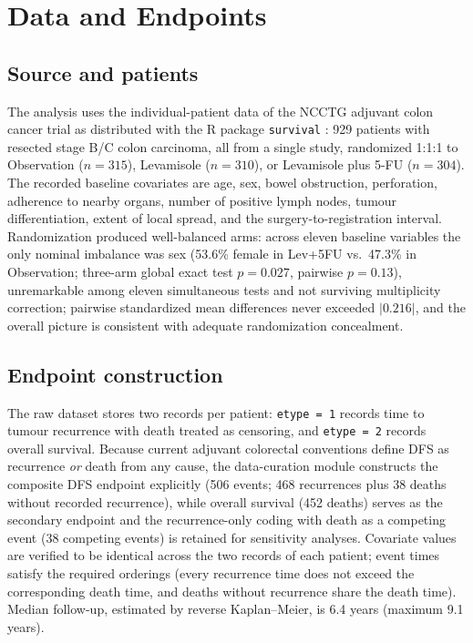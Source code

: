\section{Data and Endpoints}\label{sec:data}

\subsection{Source and patients}

The analysis uses the individual-patient data of the NCCTG adjuvant colon
cancer trial as distributed with the R package \texttt{survival}
\citep{therneau2026}: 929 patients with resected stage B/C colon
carcinoma, all from a single study, randomized 1:1:1 to Observation
($n=315$), Levamisole ($n=310$), or Levamisole plus 5-FU ($n=304$). The
recorded baseline covariates are age, sex, bowel obstruction,
perforation, adherence to nearby organs, number of positive lymph nodes,
tumour differentiation, extent of local spread, and the
surgery-to-registration interval. Randomization produced well-balanced
arms: across eleven baseline variables the only nominal imbalance was
sex (53.6\% female in Lev+5FU vs.\ 47.3\% in Observation; three-arm
global exact test $p=0.027$, pairwise $p=0.13$), unremarkable among
eleven simultaneous tests and not surviving multiplicity correction;
pairwise standardized mean differences never exceeded $|0.216|$, and the
overall picture is consistent with adequate randomization concealment.

\subsection{Endpoint construction}

The raw dataset stores two records per patient: \texttt{etype~=~1} records
time to tumour recurrence with death treated as censoring, and
\texttt{etype~=~2} records overall survival. Because current adjuvant
colorectal conventions define DFS as recurrence \emph{or} death from any
cause, the data-curation module constructs the composite DFS endpoint
explicitly (506 events; 468 recurrences plus 38 deaths without recorded
recurrence), while overall survival (452 deaths) serves as the secondary
endpoint and the recurrence-only coding with death as a competing event
(38 competing events) is retained for sensitivity analyses. Covariate
values are verified to be identical across the two records of each
patient; event times satisfy the required orderings (every recurrence
time does not exceed the corresponding death time, and deaths without
recurrence share the death time). Median follow-up, estimated by reverse
Kaplan--Meier, is 6.4 years (maximum 9.1 years).

